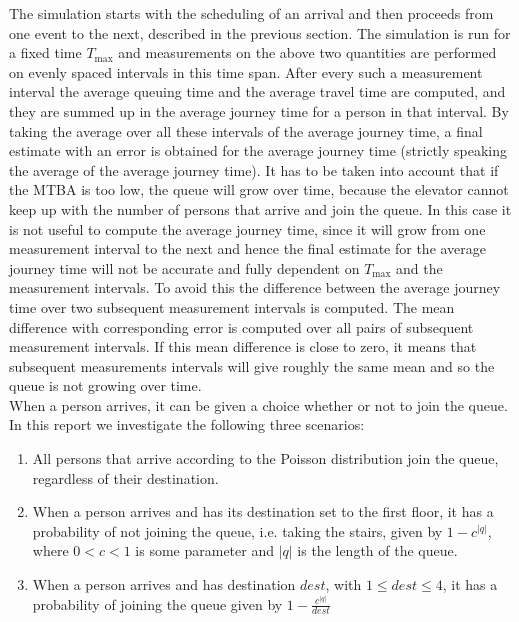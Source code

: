 \documentclass[10pt,a4paper]{article}
\begin{document}
\noindent The simulation starts with the scheduling of an arrival and then proceeds from one event to the next, described in the previous section. The simulation is run for a fixed time $T_{\text{max}}$ and measurements on the above two quantities are performed on evenly spaced intervals in this time span. After every such a measurement interval the average queuing time and the average travel time are computed, and they are summed up in the average journey time for a person in that interval. By taking the average over all these intervals of the average journey time, a final estimate with an error is obtained for the average journey time (strictly speaking the average of the average journey time).
It has to be taken into account that if the MTBA is too low, the queue will grow over time, because the elevator cannot keep up with the number of persons that arrive and join the queue. In this case it is not useful to compute the average journey time, since it will grow from one measurement interval to the next and hence the final estimate for the average journey time will not be accurate and fully dependent on $T_{\text{max}}$ and the measurement intervals. To avoid this the difference between the average journey time over two subsequent measurement intervals is computed. The mean difference with corresponding error is computed over all pairs of subsequent measurement intervals. If this mean difference is close to zero, it means that subsequent measurements intervals will give roughly the same mean and so the queue is not growing over time.\\
\newline
When a person arrives, it can be given a choice whether or not to join the queue. In this report we investigate the following three scenarios:

\begin{enumerate}
  \item
    All persons that arrive according to the Poisson distribution join the queue, regardless of their destination.
  \item
    When a person arrives and has its destination set to the first floor, it has a probability of not joining the queue, i.e. taking the stairs, given by $1 - c^{|q|}$, where $0 < c < 1$ is some parameter and $|q|$ is the length of the queue.
  \item
    When a person arrives and has destination $dest$, with $1 \leq dest \leq 4$, it has a probability of joining the queue given by $1 - \frac{c^{|q|}}{dest}$
\end{enumerate}
\end{document}
